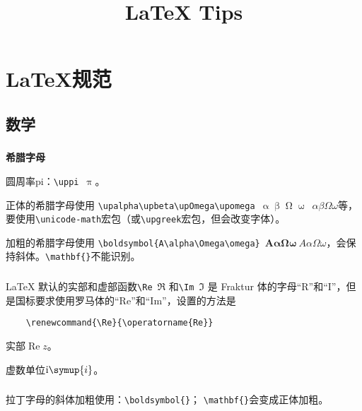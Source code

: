 \documentclass{article}
\title{\LaTeX{} Tips}
\date{}
\author{}
\begin{document}
\maketitle
\section{\LaTeX 规范}

\subsection{数学}
\subsubsection{}
\textbf{希腊字母}

圆周率pi：\verb|\uppi|~$\uppi$。

正体的希腊字母使用 \verb|\upalpha\upbeta\upOmega\upomega|~$\upalpha\upbeta\upOmega\upomega$~$\alpha\beta\Omega\omega$等，要使用\verb|\unicode-math|宏包（或\verb|\upgreek|宏包，但会改变字体）。

加粗的希腊字母使用 \verb|\boldsymbol{A\alpha\Omega\omega}|~$\boldsymbol{A\alpha\Omega\omega}~A\alpha\Omega\omega$，会保持斜体。\verb|\mathbf{}|不能识别。

\subsubsection{}

LaTeX 默认的实部和虚部函数\verb|\Re|~$\Re$ 和\verb|\Im|~$\Im$ 是 Fraktur 体的字母“R”和“I”，但是国标要求使用罗马体的“Re”和“Im”，设置的方法是
\begin{lstlisting}
	\renewcommand{\Re}{\operatorname{Re}}
\end{lstlisting}
\renewcommand{\Re}{\operatorname{Re}}
实部$\Re z$。

虚数单位$\mathrm{i}\symup{i}$。


\subsubsection{}

拉丁字母的斜体加粗使用：\verb|\boldsymbol{}|；
\verb|\mathbf{}|会变成正体加粗。

\subsubsection{}
\end{document}
